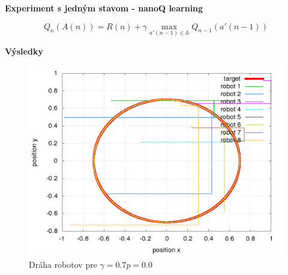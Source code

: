 \documentclass[xcolor=dvipsnames]{beamer}
\begin{document}
\begin{frame}{\bf Experiment s jedným stavom - nanoQ learning}
\begin{minipage}{.5\textwidth}
  \end{minipage}

  \begin{equation}
  Q_n(A(n)) = R(n) + \gamma  \max_{a'(n-1) \in \mathbb{A}} Q_{n-1}(a'(n-1))
  \label{eq:nano_q_func}
  \end{equation}


\end{frame}

\begin{frame}{\bf Výsledky}


  \begin{minipage}{.5\textwidth}

    \begin{figure}[!htb]
    \centering
    \includegraphics[scale=.2]{../../results_q_learning/nano_q_learning/result_00/robot_path.png}
    \caption{Dráha robotov pre $\gamma = 0.7 p = 0.0$}
    \label{img:nano_q_result_00_path}
    \end{figure}


  \end{minipage}%
  \begin{minipage}{.5\textwidth}


\end{minipage}
\end{frame}
\end{document}
